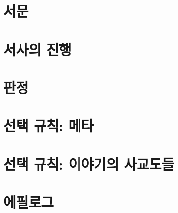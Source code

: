 \documentclass{report}
\begin{document}
	\ifprintout\else
		\parttoc
	\fi
	
	\chapter{서문}
		
	
	\chapter{서사의 진행}
		
	
	\hypertarget{nogm-diceroll}{}
	\chapter{판정}
		
		
	\chapter{선택 규칙: 메타}
		
	
	\hypertarget{nogm-socialite}{}
	\chapter{선택 규칙: 이야기의 사교도들}
		
	
	\chapter{에필로그}
		
\end{document}
